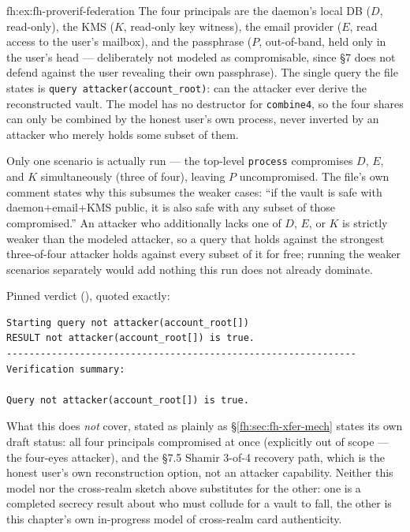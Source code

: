 \begin{pdSolution}{fh:ex:fh-proverif-federation}
The four principals are the daemon's local DB ($D$, read-only), the KMS ($K$, read-only key witness), the email provider ($E$, read access to the user's mailbox), and the passphrase ($P$, out-of-band, held only in the user's head --- deliberately not modeled as compromisable, since \S7 does not defend against the user revealing their own passphrase). The single query the file states is \texttt{query attacker(account\_root)}: can the attacker ever derive the reconstructed vault. The model has no destructor for \texttt{combine4}, so the four shares can only be combined by the honest user's own process, never inverted by an attacker who merely holds some subset of them.

Only one scenario is actually run --- the top-level \texttt{process} compromises $D$, $E$, and $K$ simultaneously (three of four), leaving $P$ uncompromised. The file's own comment states why this subsumes the weaker cases: ``if the vault is safe with daemon+email+KMS public, it is also safe with any subset of those compromised.'' An attacker who additionally lacks one of $D$, $E$, or $K$ is strictly weaker than the modeled attacker, so a query that holds against the strongest three-of-four attacker holds against every subset of it for free; running the weaker scenarios separately would add nothing this run does not already dominate.

Pinned verdict (), quoted exactly:
\begin{lstlisting}
Starting query not attacker(account_root[])
RESULT not attacker(account_root[]) is true.
--------------------------------------------------------------
Verification summary:

Query not attacker(account_root[]) is true.
\end{lstlisting}
What this does \emph{not} cover, stated as plainly as \S\ref{fh:sec:fh-xfer-mech} states its own draft status: all four principals compromised at once (explicitly out of scope --- the four-eyes attacker), and the \S7.5 Shamir 3-of-4 recovery path, which is the honest user's own reconstruction option, not an attacker capability. Neither this model nor the cross-realm sketch above substitutes for the other: one is a completed secrecy result about who must collude for a vault to fall, the other is this chapter's own in-progress model of cross-realm card authenticity.
\end{pdSolution}
